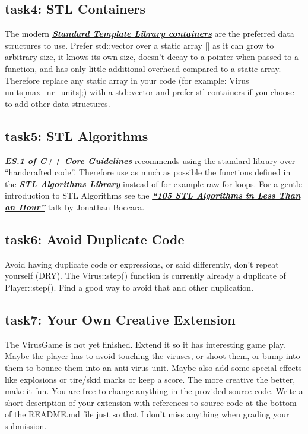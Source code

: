 \documentclass[12pt]{article}
\newcommand*{\link}[2]{\href{#1}{\color{blue}\textbf{\textit{#2}}}}
\begin{document}
\subsection{task4: STL Containers}
The modern \link{http://www.cplusplus.com/reference/stl/}{Standard
  Template Library containers} are the preferred data structures to
use. Prefer std::vector over a static array [] as it can grow to
arbitrary size, it knows its own size, doesn't decay to a pointer when
passed to a function, and has only little additional overhead compared
to a static array. Therefore replace any static array in your code
(for example: Virus units[max\_nr\_units];) with a std::vector and
prefer stl containers if you choose to add other data structures.

\subsection{task5: STL Algorithms}
\link{https://isocpp.github.io/CppCoreGuidelines/CppCoreGuidelines\#Res-lib}
{ES.1 of C++ Core Guidelines} recommends using the standard library
over ``handcrafted code''.  Therefore use as much as possible the
functions defined in the
\link{https://en.cppreference.com/w/cpp/algorithm} {STL Algorithms
  Library} instead of for example raw for-loops. For a gentle
introduction to STL Algorithms see the
\link{https://www.youtube.com/watch?v=2olsGf6JIkU} {``105 STL
  Algorithms in Less Than an Hour''} talk by Jonathan Boccara.

\subsection{task6: Avoid Duplicate Code}
Avoid having duplicate code or expressions, or said differently, don't
repeat yourself (DRY). The Virus::step() function is currently already
a duplicate of Player::step(). Find a good way to avoid that and other
duplication.

\subsection{task7: Your Own Creative Extension}
The VirusGame is not yet finished. Extend it so it has interesting
game play. Maybe the player has to avoid touching the viruses, or
shoot them, or bump into them to bounce them into an anti-virus
unit. Maybe also add some special effects like explosions or tire/skid
marks or keep a score. The more creative the better, make it fun. You
are free to change anything in the provided source code. Write a short
description of your extension with references to source code at the
bottom of the README.md file just so that I don't miss anything when
grading your submission.
\end{document}
